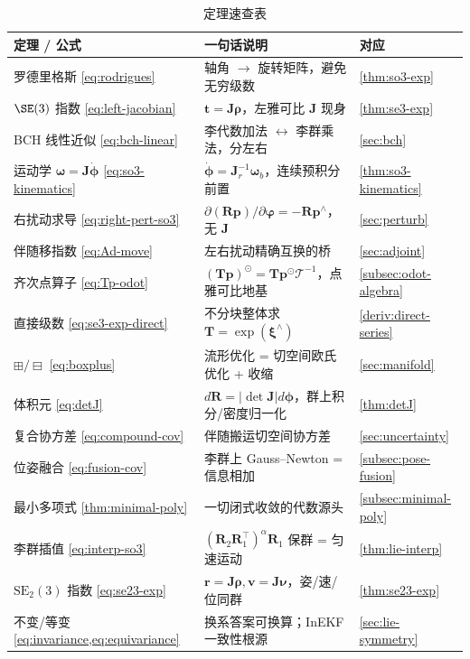 \begin{table}[H]\centering\small
\caption{定理速查表}
\begin{tabular}{lll}
\toprule
定理 / 公式 & 一句话说明 & 对应 \\
\midrule
罗德里格斯 \cref{eq:rodrigues} & 轴角 $\to$ 旋转矩阵，避免无穷级数 & \cref{thm:so3-exp} \\
$\SE(3)$ 指数 \cref{eq:left-jacobian} & $\mathbf{t}=\mathbf{J}\boldsymbol{\rho}$，左雅可比 $\mathbf{J}$ 现身 & \cref{thm:se3-exp} \\
BCH 线性近似 \cref{eq:bch-linear} & 李代数加法 $\leftrightarrow$ 李群乘法，分左右 & \cref{sec:bch} \\
运动学 $\boldsymbol{\omega}=\mathbf{J}\dot{\boldsymbol{\phi}}$ \cref{eq:so3-kinematics} & $\dot{\boldsymbol{\phi}}=\mathbf{J}_r^{-1}\boldsymbol{\omega}_b$，连续预积分前置 & \cref{thm:so3-kinematics} \\
右扰动求导 \cref{eq:right-pert-so3} & $\partial(\mathbf{R}\mathbf{p})/\partial\boldsymbol{\varphi}=-\mathbf{R}\mathbf{p}^\wedge$，无 $\mathbf{J}$ & \cref{sec:perturb} \\
伴随移指数 \cref{eq:Ad-move} & 左右扰动精确互换的桥 & \cref{sec:adjoint} \\
齐次点算子 \cref{eq:Tp-odot} & $(\mathbf{T}\mathbf{p})^\odot=\mathbf{T}\mathbf{p}^\odot\boldsymbol{\mathcal{T}}^{-1}$，点雅可比地基 & \cref{subsec:odot-algebra} \\
直接级数 \cref{eq:se3-exp-direct} & 不分块整体求 $\mathbf{T}=\exp(\boldsymbol{\xi}^\wedge)$ & \cref{deriv:direct-series} \\
$\boxplus/\boxminus$ \cref{eq:boxplus} & 流形优化 = 切空间欧氏优化 + 收缩 & \cref{sec:manifold} \\
体积元 \cref{eq:detJ} & $d\mathbf{R}=|\det\mathbf{J}|d\boldsymbol{\phi}$，群上积分/密度归一化 & \cref{thm:detJ} \\
复合协方差 \cref{eq:compound-cov} & 伴随搬运切空间协方差 & \cref{sec:uncertainty} \\
位姿融合 \cref{eq:fusion-cov} & 李群上 Gauss--Newton = 信息相加 & \cref{subsec:pose-fusion} \\
最小多项式 \cref{thm:minimal-poly} & 一切闭式收敛的代数源头 & \cref{subsec:minimal-poly} \\
李群插值 \cref{eq:interp-so3} & $(\mathbf{R}_2\mathbf{R}_1^\top)^\alpha\mathbf{R}_1$ 保群 = 匀速运动 & \cref{thm:lie-interp} \\
$\mathrm{SE}_2(3)$ 指数 \cref{eq:se23-exp} & $\mathbf{r}=\mathbf{J}\boldsymbol{\rho},\mathbf{v}=\mathbf{J}\boldsymbol{\nu}$，姿/速/位同群 & \cref{thm:se23-exp} \\
不变/等变 \cref{eq:invariance,eq:equivariance} & 换系答案可换算；InEKF 一致性根源 & \cref{sec:lie-symmetry} \\
\bottomrule
\end{tabular}
\end{table}

